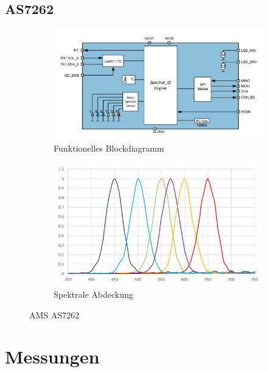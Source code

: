\documentclass[11pt]{scrartcl}
\begin{document}
\subsection{AS7262}
\begin{figure}[H]
    \centering
    \begin{subfigure}[b]{0.49\textwidth}
        \includegraphics[width=\textwidth]{images/AS7262_functional_blockdiagram.png}
        \caption{Funktionelles Blockdiagramm}
    \end{subfigure}
    \hfill 
    \begin{subfigure}[b]{0.49\textwidth}
        \includegraphics[width=\textwidth]{images/AS7262_spectrum.png}
        \caption{Spektrale Abdeckung}
    \end{subfigure}
    \caption{AMS AS7262 \cite{datasheet62}}\label{fig:AS7262}
\end{figure}
\noindent
\clearpage

\section{Messungen}
\clearpage
\end{document}
